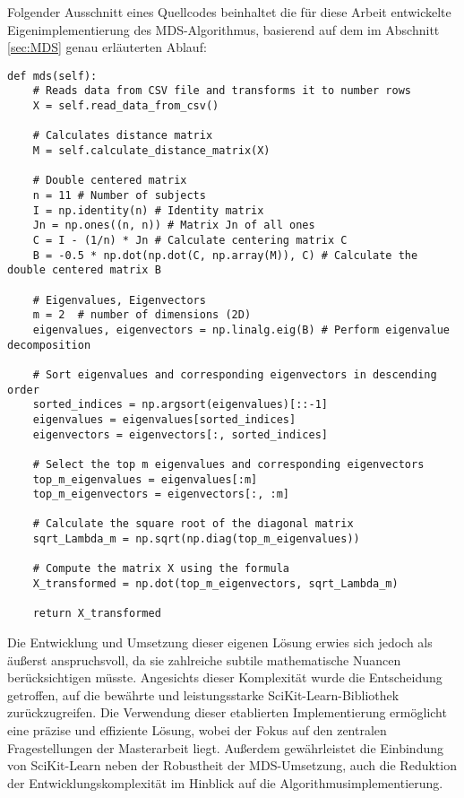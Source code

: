 \noindent
\begin{minipage}{\linewidth}
Folgender Ausschnitt eines Quellcodes beinhaltet die für diese
Arbeit entwickelte Eigenimplementierung des MDS-Algorithmus, basierend auf dem im Abschnitt
\ref{sec:MDS} genau erläuterten Ablauf:
\begin{lstlisting}[style=Python]
def mds(self):
    # Reads data from CSV file and transforms it to number rows
    X = self.read_data_from_csv()

    # Calculates distance matrix
    M = self.calculate_distance_matrix(X)

    # Double centered matrix
    n = 11 # Number of subjects
    I = np.identity(n) # Identity matrix
    Jn = np.ones((n, n)) # Matrix Jn of all ones
    C = I - (1/n) * Jn # Calculate centering matrix C
    B = -0.5 * np.dot(np.dot(C, np.array(M)), C) # Calculate the double centered matrix B

    # Eigenvalues, Eigenvectors
    m = 2  # number of dimensions (2D)
    eigenvalues, eigenvectors = np.linalg.eig(B) # Perform eigenvalue decomposition

    # Sort eigenvalues and corresponding eigenvectors in descending order
    sorted_indices = np.argsort(eigenvalues)[::-1]
    eigenvalues = eigenvalues[sorted_indices]
    eigenvectors = eigenvectors[:, sorted_indices]

    # Select the top m eigenvalues and corresponding eigenvectors
    top_m_eigenvalues = eigenvalues[:m]
    top_m_eigenvectors = eigenvectors[:, :m]

    # Calculate the square root of the diagonal matrix
    sqrt_Lambda_m = np.sqrt(np.diag(top_m_eigenvalues))

    # Compute the matrix X using the formula
    X_transformed = np.dot(top_m_eigenvectors, sqrt_Lambda_m)

    return X_transformed
\end{lstlisting}
\end{minipage}

Die Entwicklung und Umsetzung dieser eigenen Lösung erwies
sich jedoch als äußerst anspruchsvoll, da sie zahlreiche subtile mathematische
Nuancen berücksichtigen müsste. Angesichts dieser Komplexität wurde die
Entscheidung getroffen, auf die bewährte und leistungsstarke
SciKit-Learn-Bibliothek zurückzugreifen. Die Verwendung dieser etablierten
Implementierung ermöglicht eine präzise und effiziente Lösung, wobei der Fokus
auf den zentralen Fragestellungen der Masterarbeit liegt. Außerdem gewährleistet
die Einbindung von SciKit-Learn neben der Robustheit der MDS-Umsetzung, auch die
Reduktion der Entwicklungskomplexität im Hinblick auf die
Algorithmusimplementierung. \parencite{developers_scikit}


